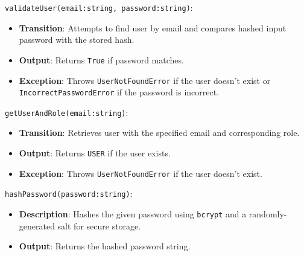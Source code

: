 \documentclass[12pt, titlepage]{article}
\begin{document}
\begin{description}
  \item
  \texttt{validateUser(email:string, password:string)}:
  \item
  \begin{itemize}
    \item \textbf{Transition}: Attempts to find user by email and compares hashed
    input password with the stored hash.
  \end{itemize}
  \item
  \begin{itemize}
    \item \textbf{Output}: Returns \texttt{True} if password matches.
  \end{itemize}
  \item
  \begin{itemize}
    \item \textbf{Exception}: Throws \texttt{UserNotFoundError} if the user
    doesn't exist or \\ \texttt{IncorrectPasswordError} if the password is
    incorrect.
  \end{itemize}

  \item
  \texttt{getUserAndRole(email:string)}:
  \item
  \begin{itemize}
    \item \textbf{Transition}: Retrieves user with the specified email and
    corresponding role.
  \end{itemize}
  \item
  \begin{itemize}
    \item \textbf{Output}: Returns \texttt{USER} if the user exists.
  \end{itemize}
  \item
  \begin{itemize}
    \item \textbf{Exception}: Throws \texttt{UserNotFoundError} if the user
    doesn't exist.
  \end{itemize}

  \item[Local Function:]
  \item
  \texttt{hashPassword(password:string)}:
  \item
  \begin{itemize}
    \item \textbf{Description}: Hashes the given password using \texttt{bcrypt}
    and a randomly-generated salt for secure storage.
  \end{itemize}
  \item 
  \begin{itemize}
    \item \textbf{Output}: Returns the hashed password string.
  \end{itemize}
\end{description}
\end{document}
